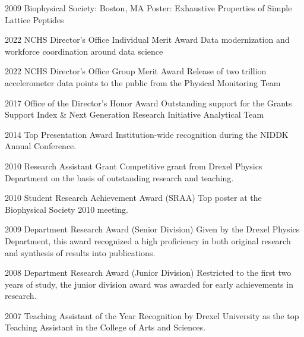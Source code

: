 \documentclass[]{scrartcl}
\begin{document}
\begin{cleanCV}
\WorkExperienceX
{2009}
{Biophysical Society: Boston, MA}
{Poster: Exhaustive Properties of Simple Lattice Peptides}



\newpage


\WorkExperienceX
{2022}
{NCHS Director's Office Individual Merit Award}
{Data modernization and workforce coordination around data science}

\WorkExperienceX
{2022}
{NCHS Director's Office Group Merit Award}
{Release of two trillion accelerometer data points to the public from the Physical Monitoring Team}

\WorkExperienceX
{2017}
{Office of the Director's Honor Award}
{Outstanding support for the Grants Support Index \& Next Generation Research Initiative Analytical Team}

\WorkExperienceX
{2014}
{Top Presentation Award}
{Institution-wide recognition during the NIDDK Annual Conference.}

\WorkExperienceX
{2010}
{Research Assistant Grant}
{Competitive grant from Drexel Physics Department on the basis of outstanding research and teaching.}

\WorkExperienceX
{2010}
{Student Research Achievement Award (SRAA)}
{Top poster at the Biophysical Society 2010 meeting. }

\WorkExperienceX
{2009}
{Department Research Award (Senior Division)}
{Given by the Drexel Physics Department, this award recognized a high proficiency in both original research and synthesis of results into publications.}

\WorkExperienceX
{2008}
{Department Research Award (Junior Division)}
{Restricted to the first two years of study, the junior division award was awarded for early achievements in research.}

\WorkExperienceX
{2007}
{Teaching Assistant of the Year}
{Recognition by Drexel University as the top Teaching Assistant in the College of Arts and Sciences.}







\newcommand{\TeachingNote}{$^*$}


\end{cleanCV}
\end{document}
